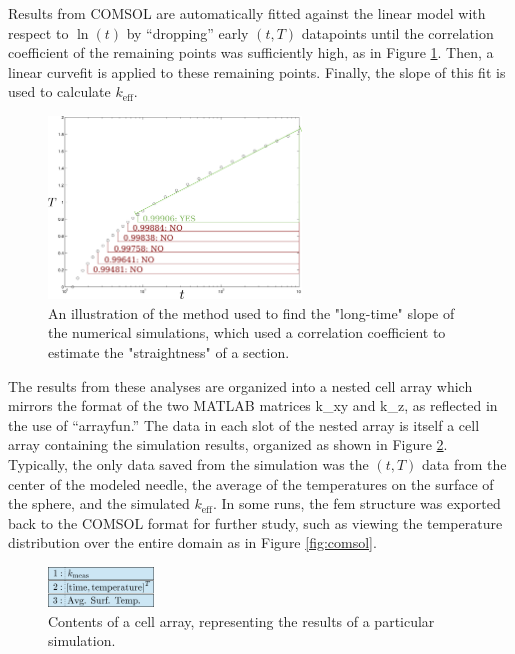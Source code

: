 Results from COMSOL are automatically fitted against the linear model with
respect to \(\ln(t)\) by ``dropping'' early \((t,T)\) datapoints until the
correlation coefficient of the remaining points was sufficiently high, as in Figure \ref{fig:curvefit}. Then, a
linear curvefit is applied to these remaining points. Finally, the slope of this fit is
used to calculate \(k_{\textrm{eff}}\).

\begin{figure}[h]
\centering
\includegraphics[width=0.6\textwidth]{fig/curvefit.png}
\caption{An illustration of the method used to find the "long-time" slope of the numerical simulations, which used a correlation coefficient to estimate the "straightness" of a section.}
\label{fig:curvefit}
\end{figure}

The results from these analyses are organized into a nested
cell array which mirrors the format of the two MATLAB matrices k\_xy and k\_z,
as reflected in the use of ``arrayfun.'' The data in each slot of the
nested array is itself a cell array containing the simulation results, organized as shown
in Figure \ref{fig:cellarray}. Typically, the only data saved from the simulation was the \((t,T)\) data from the center of the modeled needle, the average of the temperatures on the surface of the sphere, and the simulated \(k_{\textrm{eff}}\). In some runs, the fem structure was exported back to the COMSOL format for
further study, such as viewing the temperature distribution over the entire
domain as in Figure \ref{fig:comsol}. 


\begin{figure}

\centering
\includegraphics[width=0.25\textwidth]{fig/cellarray.png}
\caption{Contents of a cell array, representing the results of a particular simulation.}
\label{fig:cellarray}
\end{figure}

